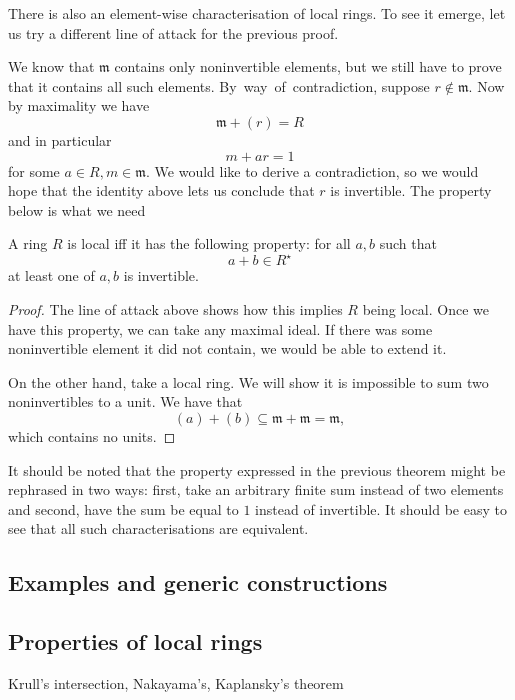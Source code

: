 There is also an element-wise characterisation of local rings. To see it
emerge, let us try a different line of attack for the previous proof.

We know that \( \mathfrak{m} \) contains only noninvertible elements,
but we still have to prove that it contains all such elements. By~way~of~contradiction,
suppose \( r \not\in \mathfrak{m} \). Now by maximality we have
\[ 
    \mathfrak{m} + (r) = R 
\]
and in particular
\[ 
    m + ar = 1 
\]
for some \( a \in R, m \in \mathfrak{m}\). We would like to derive a contradiction,
so we would hope that the identity above lets us conclude that \( r \) is invertible.
The property below is what we need

\begin{thm}
   A ring \( R \) is local iff it has the following property: for all \( a, b \) such that  
   \[ 
      a + b \in R^\star 
  \]
    at least one of \( a,b \) is invertible. 
\end{thm}

\begin{proof}
    The line of attack above shows how this implies \( R \) being local.
    Once we have this property, we can take any maximal ideal. If there was
    some noninvertible element it did not contain, we would be able to extend it.

    On the other hand, take a local ring. We will show it is impossible to sum
    two noninvertibles to a unit. We have that
    \[ 
    (a) + (b) \subseteq \mathfrak{m} + \mathfrak{m} = \mathfrak{m}, 
   \]
   which contains no units.

\end{proof}

It should be noted that the property expressed in the previous theorem might
be rephrased in two ways: first, take an arbitrary finite sum instead of two
elements and second, have the sum be equal to \( 1 \) instead of invertible.
It should be easy to see that all such characterisations are equivalent.

\subsection{Examples and generic constructions}

\subsection{Properties of local rings}

Krull's intersection, Nakayama's, Kaplansky's theorem

